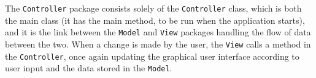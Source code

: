 The \texttt{Controller} package consists solely of the \texttt{Controller} class, which is both the main class (it has the main method, to be run when the application starts), and it is the link between the \texttt{Model} and \texttt{View} packages handling the flow of data between the two. When a change is made by the user, the \texttt{View} calls a method in the \texttt{Controller}, once again updating the graphical user interface according to user input and the data stored in the \texttt{Model}.